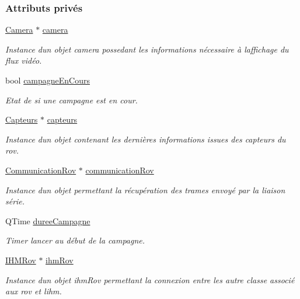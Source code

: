 \subsubsection*{Attributs privés}
\begin{DoxyCompactItemize}
\item 
\hyperlink{class_camera}{Camera} $\ast$ \hyperlink{class_rov_ad0461ecece812497ee9b4a962f168c18}{camera}
\begin{DoxyCompactList}\small\item\em Instance d\textquotesingle{}un objet camera possedant les informations nécessaire à l\textquotesingle{}affichage du flux vidéo. \end{DoxyCompactList}\item 
bool \hyperlink{class_rov_abc9d61d10d8fb5e99283d3775baf98a8}{campagne\+En\+Cours}
\begin{DoxyCompactList}\small\item\em Etat de si une campagne est en cour. \end{DoxyCompactList}\item 
\hyperlink{class_capteurs}{Capteurs} $\ast$ \hyperlink{class_rov_a1b34d63d505da660be27b75ad93754c3}{capteurs}
\begin{DoxyCompactList}\small\item\em Instance d\textquotesingle{}un objet contenant les dernières informations issues des capteurs du rov. \end{DoxyCompactList}\item 
\hyperlink{class_communication_rov}{Communication\+Rov} $\ast$ \hyperlink{class_rov_a8e7aaa17ee2134f26d57241d11ab2a99}{communication\+Rov}
\begin{DoxyCompactList}\small\item\em Instance d\textquotesingle{}un objet permettant la récupération des trames envoyé par la liaison série. \end{DoxyCompactList}\item 
Q\+Time \hyperlink{class_rov_a148a0ff28fc2dbed7b65466d77297b8a}{duree\+Campagne}
\begin{DoxyCompactList}\small\item\em Timer lancer au début de la campagne. \end{DoxyCompactList}\item 
\hyperlink{class_i_h_m_rov}{I\+H\+M\+Rov} $\ast$ \hyperlink{class_rov_a9b1c1c3b4e268a32e69b2ea4c863b817}{ihm\+Rov}
\begin{DoxyCompactList}\small\item\em Instance d\textquotesingle{}un objet ihm\+Rov permettant la connexion entre les autre classe associé aux rov et l\textquotesingle{}ihm. \end{DoxyCompactList}\item 

\end{DoxyCompactItemize}
